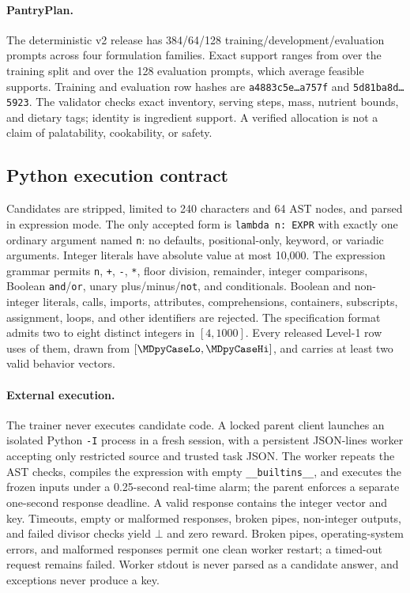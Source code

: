 \documentclass{article}
\newcommand{\1}{\mathbf 1}
\theoremstyle{remark}
\theoremstyle{definition}
\theoremstyle{plain}
\begin{document}
\paragraph{PantryPlan.}
\label{app:data-pantry}
The deterministic v2 release has 384/64/128 training/development/evaluation
prompts across four formulation families. Exact support ranges from
\MDvmPantryTrainRange{} over the training split and \MDvmPantryRange{} over
the 128 evaluation prompts, which
average \MDvmPantryMean{} feasible supports. Training and evaluation row hashes are
\texttt{a4883c5e\ldots a757f} and \texttt{5d81ba8d\ldots5923}.
The validator checks exact inventory, serving steps, mass, nutrient bounds,
and dietary tags; identity is ingredient support. A verified allocation is
not a claim of palatability, cookability, or safety.

\subsection{Python execution contract}
\label{app:python}
\label{app:python-language}

Candidates are stripped, limited to 240 characters and 64 AST nodes, and
parsed in expression mode. The only accepted form is \texttt{lambda n: EXPR}
with exactly one ordinary argument named \texttt{n}: no defaults,
positional-only, keyword, or variadic arguments. Integer literals have
absolute value at most 10,000. The expression grammar permits \texttt{n},
\texttt{+}, \texttt{-}, \texttt{*}, floor division, remainder, integer
comparisons, Boolean \texttt{and}/\texttt{or}, unary plus/minus/\texttt{not},
and conditionals. Boolean and non-integer literals, calls, imports,
attributes, comprehensions, containers, subscripts, assignment, loops, and
other identifiers are rejected. The specification format admits two to eight distinct integers in
$[4,1000]$. Every released Level-1 row uses \MDpyCases{} of them, drawn from
$[\MDpyCaseLo,\MDpyCaseHi]$, and carries at least two valid behavior vectors.

\paragraph{External execution.}
\label{app:python-process}
The trainer never executes candidate code. A locked parent client launches
an isolated Python \texttt{-I} process in a fresh session, with a persistent
JSON-lines worker accepting only restricted source and trusted task JSON.
The worker repeats the AST checks, compiles the expression with empty
\texttt{\_\_builtins\_\_}, and executes the frozen inputs under a
0.25-second real-time alarm; the parent enforces a separate one-second
response deadline. A valid response contains the integer vector and key.
Timeouts, empty or malformed responses, broken pipes, non-integer outputs,
and failed divisor checks yield $\bot$ and zero reward. Broken pipes,
operating-system errors, and malformed responses permit one clean worker
restart; a timed-out request remains failed. Worker stdout is never parsed
as a candidate answer, and exceptions never produce a key.
\end{document}
